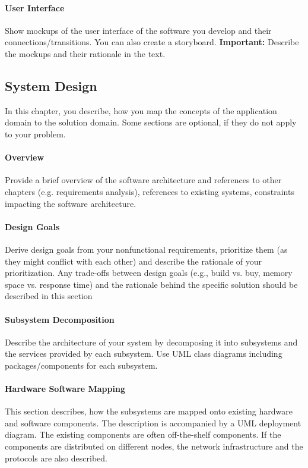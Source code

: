 		\paragraph{User Interface}
			Show mockups of the user interface of the software you develop and their connections/transitions.
			You can also create a storyboard.
			\textbf{Important:} Describe the mockups and their rationale in the text.

\subsection{System Design}
	In this chapter, you describe, how you map the concepts of the application domain to the solution domain.
	Some sections are optional, if they do not apply to your problem.
	\paragraph{Overview}
		Provide a brief overview of the software architecture and references to other chapters (e.g. requirements analysis), references to existing systems, constraints impacting the software architecture.
	\paragraph{Design Goals}
		Derive design goals from your nonfunctional requirements, prioritize them (as they might conflict with each other) and describe the rationale of your prioritization.
		Any trade-offs between design goals (e.g., build vs. buy, memory space vs. response time) and the rationale behind the specific solution should be described in this section
	\paragraph{Subsystem Decomposition}
		Describe the architecture of your system by decomposing it into subsystems and the services provided by each subsystem.
		Use UML class diagrams including packages/components for each subsystem.
	\paragraph{Hardware Software Mapping}
		This section describes, how the subsystems are mapped onto existing hardware and software components.
		The description is accompanied by a UML deployment diagram.
		The existing components are often off-the-shelf components.
		If the components are distributed on different nodes, the network infrastructure and the protocols are also described.
